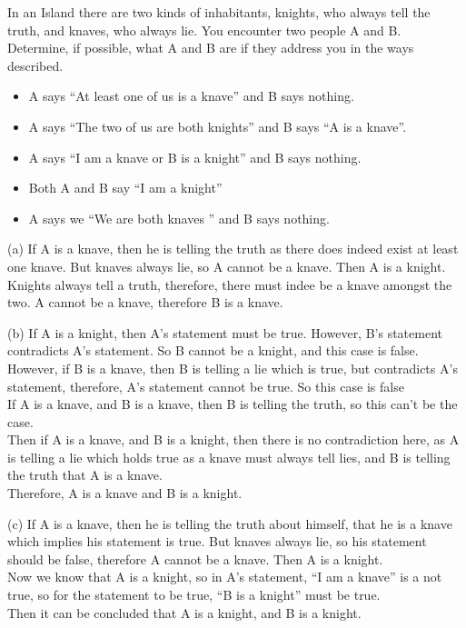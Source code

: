 \documentclass[addpoints]{exam}
\newenvironment{problem}[2][Problem]{\begin{trivlist}
    \item[\hskip \labelsep {\bfseries #1}\hskip \labelsep {\bfseries #2.}]}{\end{trivlist}}
\begin{document}
\begin{sloppypar}
\pagebreak
\begin{problem}{4}
In an Island there are two kinds of inhabitants, knights, who always tell the truth, and knaves, who always lie. You encounter two people
A and B. Determine, if possible, what A and B are if they address you in the ways described.
\begin{itemize}
    \item[(a)] A says ``At least one of us is a knave'' and B says nothing.
    \item[(b)] A says ``The two of us are both knights'' and B says ``A is a knave''.
    \item[(c)] A says ``I am a knave or B is a knight'' and B says nothing.
    \item[(d)] Both A and B say ``I am a knight''
    \item[(e)] A says we ``We are both knaves '' and B says nothing.
\end{itemize}
\end{problem}
\begin{questions}
    \question
    \begin{solution}
        
        (a) If A is a knave, then he is telling the truth as there does indeed exist at least one knave. But knaves always lie, so A cannot be a knave. Then A is a knight. Knights always tell a truth, therefore, there must indee be a knave amongst the two. A cannot be a knave, therefore B is a knave.

        (b) If A is a knight, then A's statement must be true. However, B's statement contradicts A's statement. So B cannot be a knight, and this case is false. However, if B is a knave, then B is telling a lie which is true, but contradicts A's statement, therefore, A's statement cannot be true. So this case is false \\ 
        If A is a knave, and B is a knave, then B is telling the truth, so this can't be the case. \\ 
        Then if A is a knave, and B is a knight, then there is no contradiction here, as A is telling a lie which holds true as a knave must always tell lies, and B is telling the truth that A is a knave. \\ 
        Therefore, A is a knave and B is a knight. 

        (c) If A is a knave, then he is telling the truth about himself, that he is a knave which implies his statement is true. But knaves always lie, so his statement should be false, therefore A cannot be a knave. Then A is a knight.\\ Now we know that A is a knight, so in A's statement, ``I am a knave'' is a not true, so for the statement to be true, ``B is a knight'' must be true. \\ Then it can be concluded that A is a knight, and B is a knight.


\end{solution}
\end{questions}
\end{sloppypar}
\end{document}
